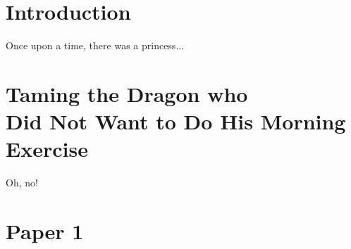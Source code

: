 \documentclass[g5paper,electronic,10pt]{kthesis}
\begin{document}
\mainmatter
\setcounter{secnumdepth}{3} %

\chapter{Introduction}
\label{cha:introduction}

Once upon a time, there was a princess...

\chapter[The Lazy-Ass Dragon]{Taming the Dragon who\\Did Not Want to Do His Morning Exercise}
\label{cha:related}
Oh, no!


% 


\appendix

\chapter{Paper 1}
\label{cha:paper-1}
\end{document}
